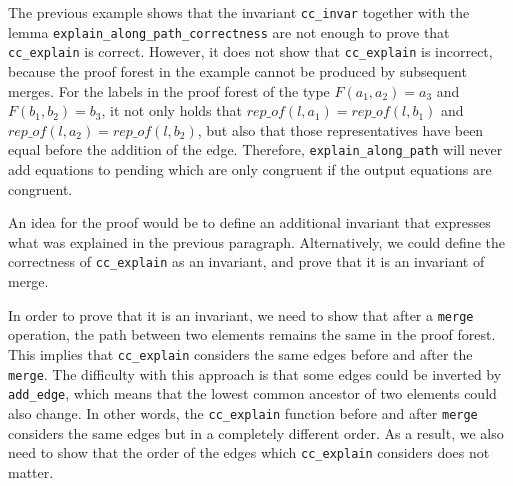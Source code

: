 The previous example shows that the invariant \lstinline|cc_invar| together with the lemma \lstinline{explain_along_path_correctness} are not enough to prove that \lstinline{cc_explain} is correct. However, it does not show that \lstinline{cc_explain} is incorrect, because the proof forest in the example cannot be produced by subsequent merges. For the labels in the proof forest of the type $F(a_1, a_2) = a_3$ and $F(b_1, b_2) = b_3$, it not only holds that $rep\_of(l, a_1) = rep\_of(l, b_1)$ and $rep\_of(l, a_2) = rep\_of(l, b_2)$, but also that those representatives have been equal before the addition of the edge. Therefore, \lstinline{explain_along_path} will never add equations to pending which are only congruent if the output equations are congruent.

An idea for the proof would be to define an additional invariant that expresses what was explained in the previous paragraph. Alternatively, we could define the correctness of \lstinline{cc_explain} as an invariant, and prove that it is an invariant of merge.

In order to prove that it is an invariant, we need to show that after a \lstinline{merge} operation, the path between two elements remains the same in the proof forest. This implies that \lstinline{cc_explain} considers the same edges before and after the \lstinline|merge|. The difficulty with this approach is that some edges could be inverted by \lstinline{add_edge}, which means that the lowest common ancestor of two elements could also change.
In other words, the \lstinline{cc_explain} function before and after \lstinline|merge| considers the same edges but in a completely different order. As a result, we also need to show that the order of the edges which \lstinline{cc_explain} considers does not matter.